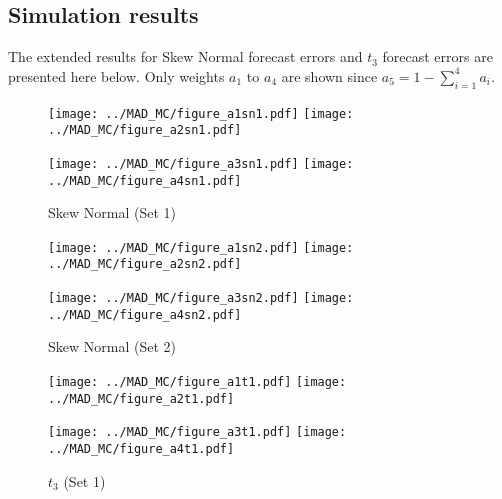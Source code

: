 \documentclass[a4paper, 11pt]{article}
\begin{document}
\subsection{Simulation results}
The extended results for Skew Normal forecast errors and $t_3$ forecast errors are presented here below. Only weights $a_1$ to $a_4$ are shown since $a_5 = 1 - \sum_{i=1}^4 a_i$.

\begin{figure}[htbp]
\centering 
\par
{\footnotesize \psfragscanon
{   \texttt{[image: ../MAD\_MC/figure\_a1sn1.pdf]}}
{   \texttt{[image: ../MAD\_MC/figure\_a2sn1.pdf]}}
\newline
}
\par
{\footnotesize \psfragscanon
{   \texttt{[image: ../MAD\_MC/figure\_a3sn1.pdf]}}
{   \texttt{[image: ../MAD\_MC/figure\_a4sn1.pdf]}}
\newline
}
\caption{Skew Normal (Set 1)}
\label{fig:simulationsum}
\end{figure}


\begin{figure}[htbp]
\centering 
\par
{\footnotesize \psfragscanon
{   \texttt{[image: ../MAD\_MC/figure\_a1sn2.pdf]}}
{   \texttt{[image: ../MAD\_MC/figure\_a2sn2.pdf]}}
\newline
}
\par
{\footnotesize \psfragscanon
{   \texttt{[image: ../MAD\_MC/figure\_a3sn2.pdf]}}
{   \texttt{[image: ../MAD\_MC/figure\_a4sn2.pdf]}}
\newline
}
\caption{Skew Normal (Set 2)}
\label{fig:simulationsum}
\end{figure}



\begin{figure}[htbp]
\centering 
\par
{\footnotesize \psfragscanon
{   \texttt{[image: ../MAD\_MC/figure\_a1t1.pdf]}}
{   \texttt{[image: ../MAD\_MC/figure\_a2t1.pdf]}}
\newline
}
\par
{\footnotesize \psfragscanon
{   \texttt{[image: ../MAD\_MC/figure\_a3t1.pdf]}}
{   \texttt{[image: ../MAD\_MC/figure\_a4t1.pdf]}}
\newline
}
\caption{$t_3$ (Set 1)}
\label{fig:simulationsum}
\end{figure}
\end{document}
